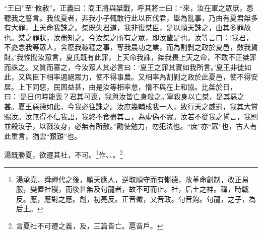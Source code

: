 {\noindent\shu{}\fzkt “王曰”至“攸赦”。正義曰：商王將與桀戰，呼其將士曰：“來，汝在軍之眾庶，悉聽我之誓言。我伐夏者，非我小子輒敢行此以臣伐君，舉為亂事，乃由有夏君桀多有大罪，上天命我誅之。桀既失君道，我非復桀臣，是以順天誅之，由其多罪故也。桀之罪狀，汝盡知之。今汝桀之所有之眾，即汝輩是也。汝等言曰：‘我君，不憂念我等眾人，舍廢我稼穡之事，奪我農功之業，而為割剝之政於夏邑，斂我貨財。’我惟聞汝眾言，夏氏既有此罪，上天命我誅，桀我畏上天之命，不敢不正桀罪而誅之。又質而審之，今汝眾人其必言曰：‘夏王之罪其實如我所言。’夏王非徒如此，又與臣下相率遏絕眾力，使不得事農。又相率為割剝之政於此夏邑，使不得安居。上下同惡，民困益甚，由是汝等相率怠，惰不與在上和協。比桀於日，曰：‘是日何時能喪？君其可喪，我與汝皆亡身殺之。’寧殺身以亡桀，是其惡之甚。夏王惡德如此，今我必往誅之。汝庶幾輔成我一人，致行天之威罰，我其大賞賜汝。汝無得不信我語，我終不食盡其言，為虛偽不實。汝若不從我之誓言，我則並殺汝子，以戮汝身，必無有所赦。”勸使勉力，勿犯法也。“庶”亦“眾”也，古人有此重言，猶雲“艱難”也。 \par}

湯既勝夏，欲遷其社，不可。\footnote{湯承堯、舜禪代之後，順天應人，逆取順守而有慚德，故革命創制，改正易服，變置社稷，而後世無及句龍者，故不可而止。社，后土之神。禪，時戰反。應，應對之應。創，初亮反。正音徵，又音政。句音鉤。句龍，之子，為后土。}作、、。\footnote{言夏社不可遷之義，及，三篇皆亡。扈音戶。}

